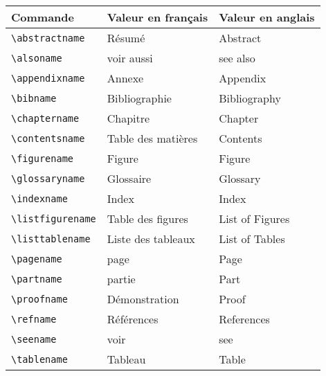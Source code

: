 \begin{tabular}{lll}
 Commande                      & Valeur en français & Valeur en anglais \\\toprule
 \lstinline+\abstractname+     & Résumé             & Abstract          \\
 \lstinline+\alsoname+         & voir aussi         & see also          \\
 \lstinline+\appendixname+     & Annexe             & Appendix          \\
 \lstinline+\bibname+          & Bibliographie      & Bibliography      \\
 \lstinline+\chaptername+      & Chapitre           & Chapter           \\
 \lstinline+\contentsname+     & Table des matières & Contents          \\
 \lstinline+\figurename+       & Figure             & Figure            \\
 \lstinline+\glossaryname+     & Glossaire          & Glossary          \\
 \lstinline+\indexname+        & Index              & Index             \\
 \lstinline+\listfigurename+   & Table des figures  & List of Figures   \\
 \lstinline+\listtablename+    & Liste des tableaux & List of Tables    \\
 \lstinline+\pagename+         & page               & Page              \\
 \lstinline+\partname+         & partie             & Part              \\
 \lstinline+\proofname+        & Démonstration      & Proof             \\
 \lstinline+\refname+          & Références         & References        \\
 \lstinline+\seename+          & voir               & see               \\
 \lstinline+\tablename+        & Tableau            & Table
\end{tabular}
